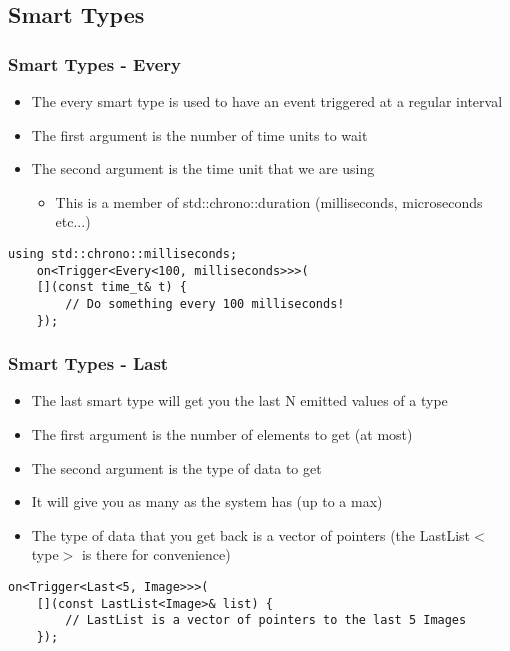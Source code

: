 \documentclass{beamer}
\begin{document}
\subsection{Smart Types}
\begin{frame}[fragile]
	\frametitle{Smart Types - Every}
	\begin{itemize}
		\item The every smart type is used to have an event triggered at a regular interval
		\item The first argument is the number of time units to wait
		\item The second argument is the time unit that we are using
		\begin{itemize}
			\item This is a member of std::chrono::duration (milliseconds, microseconds etc...)
		\end{itemize}
	\end{itemize}

	\begin{lstlisting}[language=nuclear]
	using std::chrono::milliseconds;
	on<Trigger<Every<100, milliseconds>>>(
	[](const time_t& t) {
	    // Do something every 100 milliseconds!
	});
	\end{lstlisting}
\end{frame}

\begin{frame}[fragile]
	\frametitle{Smart Types - Last}
	\begin{itemize}
		\item The last smart type will get you the last N emitted values of a type
		\item The first argument is the number of elements to get (at most)
		\item The second argument is the type of data to get
		\item It will give you as many as the system has (up to a max)
		\item The type of data that you get back is a vector of pointers (the LastList$<$type$>$ is there for convenience)
	\end{itemize}
	
	\begin{lstlisting}[language=nuclear]
	on<Trigger<Last<5, Image>>>(
	[](const LastList<Image>& list) {
	    // LastList is a vector of pointers to the last 5 Images
	});
	\end{lstlisting}
\end{frame}
\end{document}
